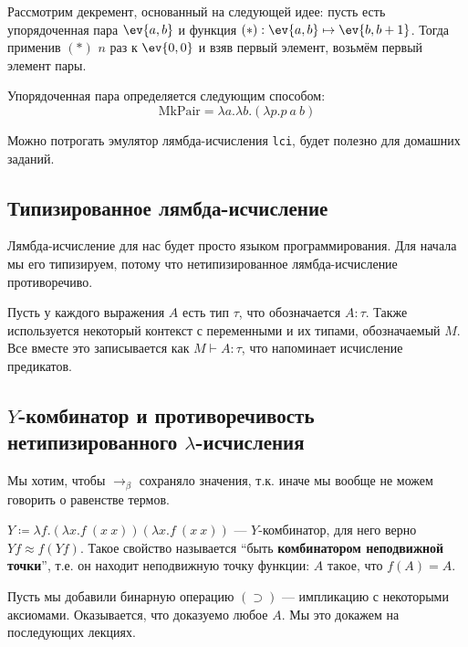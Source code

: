 Рассмотрим декремент, основанный на следующей идее: пусть есть упорядоченная пара \(\ev{a, b}\) и функция \((*) : \ev{a, b} \mapsto \ev{b, b + 1}\). Тогда применив \((*)\) \(n\) раз к \(\ev{0, 0}\) и взяв первый элемент, возьмём первый элемент пары.

Упорядоченная пара определяется следующим способом:
\[\mathrm{MkPair} = \lambda a.\lambda b.(\lambda p.p\ a\ b)\]

Можно потрогать эмулятор лямбда-исчисления \texttt{lci}, будет полезно для домашних заданий.

\subsection{Типизированное лямбда-исчисление}

Лямбда-исчисление для нас будет просто языком программирования. Для начала мы его типизируем, потому что нетипизированное лямбда-исчисление противоречиво.

Пусть у каждого выражения \(A\) есть тип \(\tau\), что обозначается \(A : \tau\). Также используется некоторый контекст с переменными и их типами, обозначаемый \(M\). Все вместе это записывается как \(M \vdash A : \tau\), что напоминает исчисление предикатов.

\subsection{\(Y\)-комбинатор и противоречивость нетипизированного \(\lambda\)-исчисления}

Мы хотим, чтобы \(\to_\beta\) сохраняло значения, т.к. иначе мы вообще не можем говорить о равенстве термов.

\begin{definition}
    \(Y \coloneqq \lambda f.(\lambda x.f\ (x\ x)) (\lambda x.f\ (x\ x))\) --- \(Y\)-комбинатор, для него верно \(Y f \approx f (Y f)\). Такое свойство называется ``быть \textbf{комбинатором неподвижной точки}'', т.е. он находит неподвижную точку функции:  \(A\) такое, что \(f(A) = A\).
\end{definition}


Пусть мы добавили бинарную операцию \((\supset)\) --- импликацию с некоторыми аксиомами. Оказывается, что доказуемо любое \(A\). Мы это докажем на последующих лекциях.


